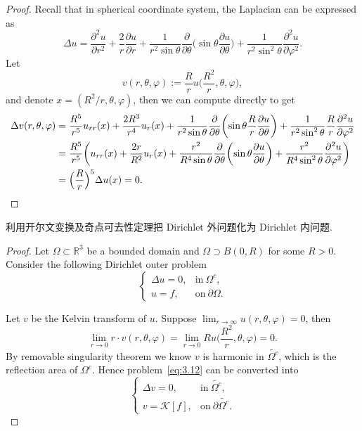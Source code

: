 \begin{proof}
  Recall that in spherical coordinate system, the Laplacian can be expressed as
  \[ \Delta u = \frac{\partial^2 u}{\partial r^2} + \frac{2}{r}\frac{\partial u}{\partial r}
      + \frac{1}{r^2\sin\theta} \frac{\partial}{\partial\theta}\biggl(\sin\theta \frac{\partial u}{\partial \theta}\biggr)
      + \frac{1}{r^2\sin^2\theta} \frac{\partial^2 u}{\partial\varphi^2}. \]
  Let
  \[ v(r,\theta,\varphi) := \frac{R}{r} u\biggl(\frac{R^2}{r},\theta,\varphi\biggr), \]
  and denote $x = (R^2/r,\theta,\varphi)$, then we can compute directly to get
  \begin{align*}
    \Delta v(r,\theta,\varphi)
    & = \frac{R^5}{r^5} u_{rr}(x) + \frac{2R^3}{r^4} u_r(x)
        + \frac{1}{r^2\sin\theta} \frac{\partial}{\partial\theta}\biggl(\sin\theta \frac{R}{r} \frac{\partial u}{\partial \theta}\biggr)
        + \frac{1}{r^2\sin^2\theta} \frac{R}{r} \frac{\partial^2 u}{\partial\varphi^2} \\
    & = \frac{R^5}{r^5} \biggl(u_{rr}(x) + \frac{2r}{R^2} u_r(x)
          + \frac{r^2}{R^4\sin\theta} \frac{\partial}{\partial\theta}\biggl(\sin\theta\frac{\partial u}{\partial\theta}\biggr)
          + \frac{r^2}{R^4\sin^2\theta} \frac{\partial^2 u}{\partial \varphi^2}\biggr) \\
    & = \Bigl(\frac{R}{r}\Bigr)^5 \Delta u(x) = 0. \qedhere
  \end{align*}
\end{proof}


\begin{exercise}
  利用开尔文变换及奇点可去性定理把 Dirichlet 外问题化为 Dirichlet 内问题.
\end{exercise}

\begin{proof}
  Let $\varOmega\subset\mathbb{R}^3$ be a bounded domain and
  $\varOmega\supset B(0,R)$ for some $R>0$.
  Consider the following Dirichlet outer problem
  \begin{equation}\label{eq:3.12}
    \begin{cases}
      \Delta u = 0, & \text{in}\ \varOmega^c, \\
      u = f, & \text{on}\ \partial\varOmega.
    \end{cases}
\end{equation}

  Let $v$ be the Kelvin transform of $u$.
  Suppose $\lim_{r\to\infty} u(r,\theta,\varphi)=0$, then
  \[ \lim_{r\to 0} r\cdot v(r,\theta,\varphi)
      = \lim_{r\to 0} R u\biggl(\frac{R^2}{r},\theta,\varphi\biggr) = 0. \]
  By removable singularity theorem we know $v$ is harmonic in $\widetilde{\varOmega^c}$,
  which is the reflection area of $\varOmega^c$. Hence problem~\eqref{eq:3.12}
  can be converted into
  \begin{equation}\label{eq:3.13}
    \begin{cases}
      \Delta v = 0, & \text{in}\ \widetilde{\varOmega^c}, \\
      v = \mathcal{K}[f], & \text{on}\ \partial\widetilde{\varOmega^c}.
    \end{cases}
  \end{equation}
\end{proof}


